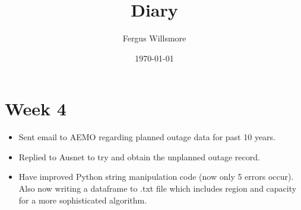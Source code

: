 \documentclass[11pt]{article}
\title{Diary}
\author{Fergus Willsmore}
\date{\today}
\begin{document}
\maketitle
\tableofcontents

\section{Week 4}

\begin{itemize}
\item Sent email to AEMO regarding planned outage data for past 10 years.
\item Replied to Ausnet to try and obtain the unplanned outage record.
\item Have improved Python string manipulation code (now only 5 errors occur). Also now writing a dataframe to .txt file which includes region and capacity for a more sophisticated algorithm. 
\end{itemize}
\end{document}
